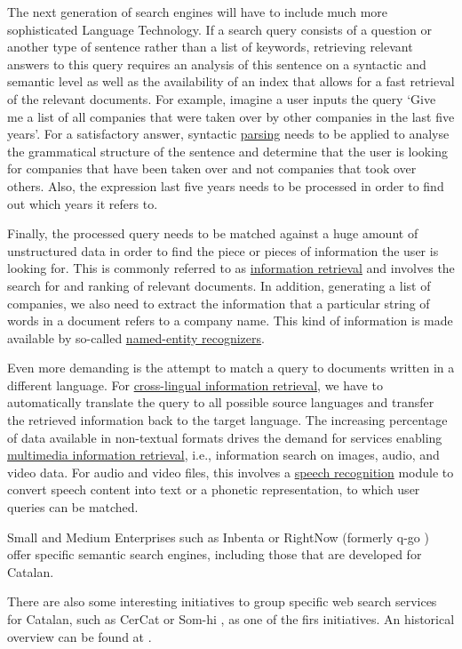 \documentclass[]{../../metanetpaper}
\begin{document}
\begin{multicols}{2}
The next generation of search engines will have to include much more sophisticated Language Technology. If a search query consists of a question or another type of sentence rather than a list of keywords, retrieving relevant answers to this query requires an analysis of this sentence on a syntactic and semantic level as well as the availability of an index that allows for a fast retrieval of the relevant documents. For example, imagine a user inputs the query ‘Give me a list of all companies that were taken over by other companies in the last five years’. For a satisfactory answer, syntactic \underline{parsing} needs to be applied to analyse the grammatical structure of the sentence and determine that the user is looking for companies that have been taken over and not companies that took over others. Also, the expression last five years needs to be processed in order to find out which years it refers to. 

Finally, the processed query needs to be matched against a huge amount of unstructured data in order to find the piece or pieces of information the user is looking for. This is commonly referred to as \underline{information retrieval} and involves the search for and ranking of relevant documents. In addition, generating a list of companies, we also need to extract the information that a particular string of words in a document refers to a company name. This kind of information is made available by so-called \underline{named-entity recognizers}. 

Even more demanding is the attempt to match a query to documents written in a different language. For \underline{cross-lingual information retrieval}, we have to automatically translate the query to all possible source languages and transfer the retrieved information back to the target language. The increasing percentage of data available in non-textual formats drives the demand for services enabling \underline{multimedia information retrieval}, i.e., information search on images, audio, and video data. For audio and video files, this involves a \underline{speech recognition} module to convert speech content into text or a phonetic representation, to which user queries can be matched.

Small and Medium Enterprises such as Inbenta \cite{CAT-inbenta} or RightNow (formerly q-go \cite{CAT-rightnow}) offer specific semantic search engines, including those that are developed for Catalan.

There are also some interesting initiatives to group specific web search services for Catalan, such as CerCat or Som-hi \cite{CAT-cercadors}, as one of the firs initiatives. An historical overview can be found at \cite{CAT-Resum-sobre-cercadors}.


\end{multicols}
\end{document}
